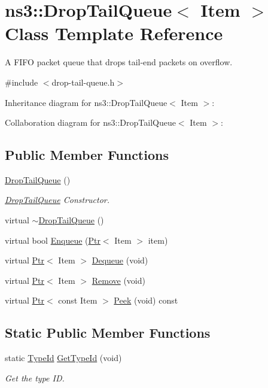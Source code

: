\hypertarget{classns3_1_1DropTailQueue}{}\section{ns3\+:\+:Drop\+Tail\+Queue$<$ Item $>$ Class Template Reference}
\label{classns3_1_1DropTailQueue}


A F\+I\+FO packet queue that drops tail-\/end packets on overflow.  




{\ttfamily \#include $<$drop-\/tail-\/queue.\+h$>$}



Inheritance diagram for ns3\+:\+:Drop\+Tail\+Queue$<$ Item $>$\+:


Collaboration diagram for ns3\+:\+:Drop\+Tail\+Queue$<$ Item $>$\+:
\subsection*{Public Member Functions}
\begin{DoxyCompactItemize}
\item 
\hyperlink{classns3_1_1DropTailQueue_a7aa50ac4127e720380d28ecdc336a2b5}{Drop\+Tail\+Queue} ()
\begin{DoxyCompactList}\small\item\em \hyperlink{classns3_1_1DropTailQueue}{Drop\+Tail\+Queue} Constructor. \end{DoxyCompactList}\item 
virtual \hyperlink{classns3_1_1DropTailQueue_a48aa86d382c738f40be5362be0faf780}{$\sim$\+Drop\+Tail\+Queue} ()
\item 
virtual bool \hyperlink{classns3_1_1DropTailQueue_a3ea35615f21fdf211d608f814508e9ba}{Enqueue} (\hyperlink{classns3_1_1Ptr}{Ptr}$<$ Item $>$ item)
\item 
virtual \hyperlink{classns3_1_1Ptr}{Ptr}$<$ Item $>$ \hyperlink{classns3_1_1DropTailQueue_ac98582fcee2920684150b09d282a7e10}{Dequeue} (void)
\item 
virtual \hyperlink{classns3_1_1Ptr}{Ptr}$<$ Item $>$ \hyperlink{classns3_1_1DropTailQueue_aa3f255bd858f53e3442ac3deb16ca54b}{Remove} (void)
\item 
virtual \hyperlink{classns3_1_1Ptr}{Ptr}$<$ const Item $>$ \hyperlink{classns3_1_1DropTailQueue_a2dec998dc6d59a31ac91d6b584dce371}{Peek} (void) const 
\end{DoxyCompactItemize}
\subsection*{Static Public Member Functions}
\begin{DoxyCompactItemize}
\item 
static \hyperlink{classns3_1_1TypeId}{Type\+Id} \hyperlink{classns3_1_1DropTailQueue_a642ecdfd3ab073765d98b4cba55d435a}{Get\+Type\+Id} (void)
\begin{DoxyCompactList}\small\item\em Get the type ID. \end{DoxyCompactList}\end{DoxyCompactItemize}
